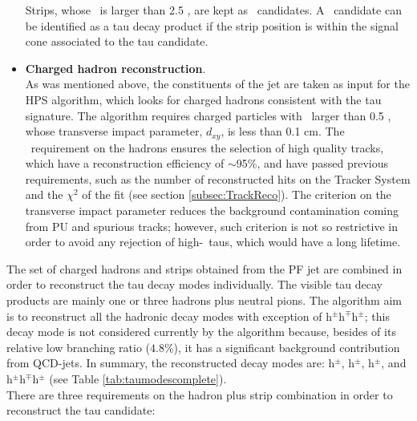 \begin{itemize}
\noindent Strips, whose \pt~is larger than 2.5 \GeV, are kept as \picero~candidates. A 
\picero~candidate can be identified as a tau decay product if the strip position 
is within the signal cone associated to the tau candidate.
 
 \item \textbf{Charged hadron reconstruction}. \\

\noindent As was mentioned above, the constituents of the jet are taken as input for the HPS algorithm,
which looks for charged hadrons consistent with the tau signature. The algorithm
requires charged particles with \pt~larger than 0.5 \GeV, whose transverse impact 
parameter, $d_{xy}$, is less than 0.1 cm. The \pt~requirement on the hadrons ensures 
the selection of high quality tracks, which have a reconstruction efficiency 
of $\sim$95$\%$, and have passed previous requirements, such as the number of reconstructed 
hits on the Tracker System and the $\chi^{2}$ of the fit 
(see section \ref{subsec:TrackReco}). The criterion on the transverse impact
parameter reduces the background contamination coming from PU and spurious tracks; however, such 
criterion is not so restrictive in order to avoid any rejection of high-\pt~taus, which
would have a long lifetime. 
\end{itemize}

\noindent The set of charged hadrons and strips obtained from the PF jet are 
combined in order to reconstruct the tau decay modes individually. The visible tau decay
products are mainly one or three hadrons plus neutral pions. The 
algorithm aim is to reconstruct all the hadronic decay modes with 
exception of h$^{\pm}$h$^{\mp}$h$^{\pm}$\picero; this decay mode 
is not considered currently by the algorithm because, besides of its
relative low branching ratio ($4.8\%$), it has a significant
background contribution from QCD-jets. In summary, the reconstructed 
decay modes are: h$^{\pm}$, h$^{\pm}$\picero, h$^{\pm}$\picero\picero, 
and h$^{\pm}$h$^{\mp}$h$^{\pm}$ (see Table \ref{tab:taumodescomplete}). \\

\noindent There are three requirements on the hadron plus strip combination
in order to reconstruct the tau candidate: 

